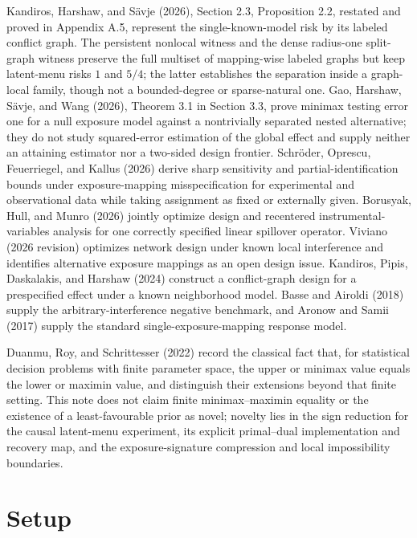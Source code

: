 \documentclass{article}
\begin{document}
Kandiros, Harshaw, and Sävje (2026), Section 2.3, Proposition 2.2, restated and proved in Appendix A.5, represent the single-known-model risk by its labeled conflict graph. The persistent nonlocal witness and the dense radius-one split-graph witness preserve the full multiset of mapping-wise labeled graphs but keep latent-menu risks \(1\) and \(5/4\); the latter establishes the separation inside a graph-local family, though not a bounded-degree or sparse-natural one. Gao, Harshaw, Sävje, and Wang (2026), Theorem 3.1 in Section 3.3, prove minimax testing error one for a null exposure model against a nontrivially separated nested alternative; they do not study squared-error estimation of the global effect and supply neither an attaining estimator nor a two-sided design frontier. Schröder, Oprescu, Feuerriegel, and Kallus (2026) derive sharp sensitivity and partial-identification bounds under exposure-mapping misspecification for experimental and observational data while taking assignment as fixed or externally given. Borusyak, Hull, and Munro (2026) jointly optimize design and recentered instrumental-variables analysis for one correctly specified linear spillover operator. Viviano (2026 revision) optimizes network design under known local interference and identifies alternative exposure mappings as an open design issue. Kandiros, Pipis, Daskalakis, and Harshaw (2024) construct a conflict-graph design for a prespecified effect under a known neighborhood model. Basse and Airoldi (2018) supply the arbitrary-interference negative benchmark, and Aronow and Samii (2017) supply the standard single-exposure-mapping response model.

Duanmu, Roy, and Schrittesser (2022) record the classical fact that, for statistical decision problems with finite parameter space, the upper or minimax value equals the lower or maximin value, and distinguish their extensions beyond that finite setting. This note does not claim finite minimax--maximin equality or the existence of a least-favourable prior as novel; novelty lies in the sign reduction for the causal latent-menu experiment, its explicit primal--dual implementation and recovery map, and the exposure-signature compression and local impossibility boundaries.

\section{Setup}
\end{document}
